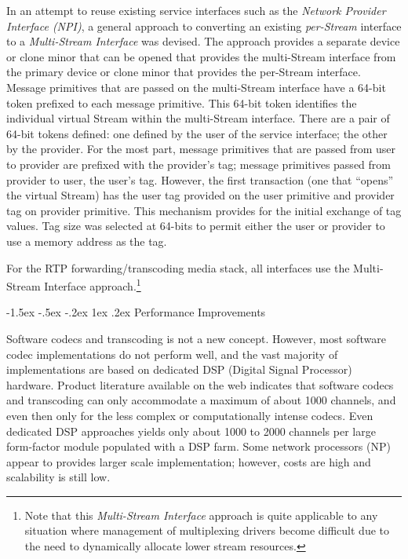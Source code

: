 \documentclass[letterpaper,final,notitlepage,twocolumn,10pt,twoside]{article}
\makeatletter
\let\normalsize = \small
\let\small = \footnotesize
\let\footnotesize = \scriptsize
\let\scriptsize = \tiny
\renewcommand\subsection{\@startsection{subsection}{2}{\z@}%
                                     {-1.5ex \@plus -.5ex \@minus -.2ex}%
                                     {1ex \@plus .2ex}%
                                     {\normalfont\normalsize\bfseries}}
\makeatother
\begin{document}
In an attempt to reuse existing service interfaces such as the {\sl Network
Provider Interface (NPI)}, a general approach to converting an existing {\it
per-Stream} interface to a {\it Multi-Stream Interface} was devised.  The
approach provides a separate device or clone minor that can be opened that
provides the multi-Stream interface from the primary device or clone minor that
provides the per-Stream interface.  Message primitives that are passed on the
multi-Stream interface have a 64-bit token prefixed to each message primitive.
This 64-bit token identifies the individual virtual Stream within the
multi-Stream interface.  There are a pair of 64-bit tokens defined: one defined
by the user of the service interface; the other by the provider.  For the most
part, message primitives that are passed from user to provider are prefixed with
the provider's tag; message primitives passed from provider to user, the user's
tag.  However, the first transaction (one that ``opens'' the virtual Stream) has
the user tag provided on the user primitive and provider tag on provider
primitive.  This mechanism provides for the initial exchange of tag values.  Tag
size was selected at 64-bits to permit either the user or provider to use a
memory address as the tag.

For the RTP forwarding/transcoding media stack, all interfaces use the
Multi-Stream Interface approach.\footnote{Note that this {\it Multi-Stream
Interface} approach is quite applicable to any situation where management of
multiplexing drivers become difficult due to the need to dynamically allocate
lower stream resources.}

\subsection{Performance Improvements}
\label{section:perf}

Software codecs and transcoding is not a new concept.  However, most software
codec implementations do not perform well, and the vast majority of
implementations are based on dedicated DSP (Digital Signal Processor) hardware.
Product literature available on the web indicates that software codecs and
transcoding can only accommodate a maximum of about 1000 channels, and even then
only for the less complex or computationally intense codecs.  Even dedicated DSP
approaches yields only about 1000 to 2000 channels per large form-factor module
populated with a DSP farm.  Some network processors (NP) appear to provides
larger scale implementation; however, costs are high and scalability is still
low.
\end{document}

